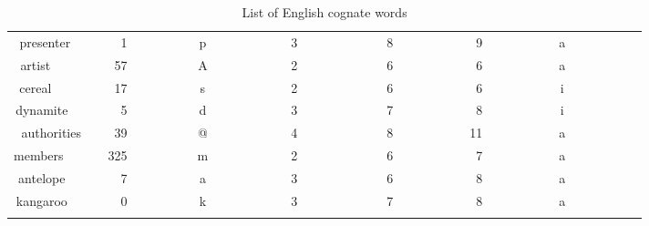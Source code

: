 \begin{longtable}{|c|c|c|c|c|c|c|}
presenter~~~&~~1~~~~~~~~~&p~~~~~~~~~~~&3~~~~~~~~~~~&~8~~~~~~~~~~&~9~~~~~~~~~~&a~~~~~~~~~~~\\ 
artist~~~~~~&~57~~~~~~~~~&A~~~~~~~~~~~&2~~~~~~~~~~~&~6~~~~~~~~~~&~6~~~~~~~~~~&a~~~~~~~~~~~\\ 
cereal~~~~~~&~17~~~~~~~~~&s~~~~~~~~~~~&2~~~~~~~~~~~&~6~~~~~~~~~~&~6~~~~~~~~~~&i~~~~~~~~~~~\\ 
dynamite~~~~&~~5~~~~~~~~~&d~~~~~~~~~~~&3~~~~~~~~~~~&~7~~~~~~~~~~&~8~~~~~~~~~~&i~~~~~~~~~~~\\ 
authorities~&~39~~~~~~~~~&@~~~~~~~~~~~&4~~~~~~~~~~~&~8~~~~~~~~~~&11~~~~~~~~~~&a~~~~~~~~~~~\\ 
members~~~~~&325~~~~~~~~~&m~~~~~~~~~~~&2~~~~~~~~~~~&~6~~~~~~~~~~&~7~~~~~~~~~~&a~~~~~~~~~~~\\ 
antelope~~~~&~~7~~~~~~~~~&a~~~~~~~~~~~&3~~~~~~~~~~~&~6~~~~~~~~~~&~8~~~~~~~~~~&a~~~~~~~~~~~\\ 
kangaroo~~~~&~~0~~~~~~~~~&k~~~~~~~~~~~&3~~~~~~~~~~~&~7~~~~~~~~~~&~8~~~~~~~~~~&a~~~~~~~~~~~\\ 
\hline
\caption{List of English cognate words}\label{eng_cognates}
\end{longtable}
